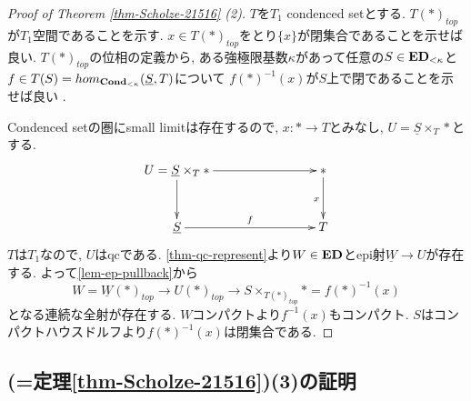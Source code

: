\documentclass[dvipdfmx,a4paper,11pt]{article}
\theoremstyle{definition}
\begin{document}
\begin{proof}[Proof of Theorem \ref{thm-Scholze-21516} (2)]
$T$を$T_1$ condenced setとする. 
$T(\ast)_{top}$が$T_1$空間であることを示す.
$x \in T(\ast)_{top}$をとり$\{ x\}$が閉集合であることを示せば良い. 
$T(\ast)_{top}$の位相の定義から, ある強極限基数$\kappa$があって任意の$S \in {\bf ED}_{< \kappa}$と$f \in T(S) = hom_{{\bf Cond}_{< \kappa}}(\underline{S}, T)$について
$f(\ast)^{-1}(x)$が$S$上で閉であることを示せば良い .

Condenced setの圏にsmall limitは存在するので, $x : \ast \to T$とみなし, $U = \underline{S} \times_{T} \ast $とする. 
\begin{equation*}
\xymatrix@C=80pt@R=30pt{
U = \underline{S} \times_{T} \ast \ar@{->}[r]
\ar@{->}[d]
& \ast \ar@{->}[d]_{x}
\\
\underline{S} \ar@{->}[r]^{f}
&T
 \\   
}
\end{equation*}
$T$は$T_1$なので, $U$はqcである.
\ref{thm-qc-represent}より$W \in {\bf ED}$とepi射$\underline{W} \to U$が存在する.
よって\ref{lem-ep-pullback}から
$$
W=\underline{W}(\ast)_{top} \to U(\ast)_{top}
\to S \times_{T(\ast)_{top}} \ast = f(\ast)^{-1}(x)
$$
となる連続な全射が存在する. 
$W$コンパクトより$f^{-1}(x)$もコンパクト. $S$はコンパクトハウスドルフより$f(\ast)^{-1}(x)$は閉集合である. 
\end{proof}

\subsection{\cite[Proposition 2.15, Theorem 2.16]{Sch19}(=定理\ref{thm-Scholze-21516})(3)の証明}
\end{document}
